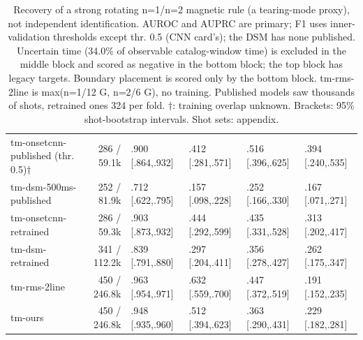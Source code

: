 \begin{table}[t]
\begin{tabular}{>{\raggedright\arraybackslash}p{1.75in}rllll}
tm-onsetcnn-published (thr. 0.5)$\dagger$ & 286 / 59.1k & .900 [.864,.932] & .412 [.281,.571] & .516 [.396,.625] & .394 [.240,.535] \\
tm-dsm-500ms-published & 252 / 81.9k & .712 [.622,.795] & .157 [.098,.228] & .252 [.166,.330] & .167 [.071,.271] \\
tm-onsetcnn-retrained & 286 / 59.3k & .903 [.873,.932] & .444 [.292,.599] & .435 [.331,.528] & .313 [.202,.417] \\
tm-dsm-retrained & 341 / 112.2k & .839 [.791,.880] & .297 [.204,.411] & .356 [.278,.427] & .262 [.175,.347] \\
tm-rms-2line & 450 / 246.8k & .963 [.954,.971] & .632 [.559,.700] & .447 [.372,.519] & .191 [.152,.235] \\
tm-ours & 450 / 246.8k & .948 [.935,.960] & .512 [.394,.623] & .363 [.290,.431] & .229 [.182,.281] \\
\bottomrule
\end{tabular}
\caption{Recovery of a strong rotating n=1/n=2 magnetic rule (a tearing-mode proxy), not independent identification. AUROC and AUPRC are primary; F1 uses inner-validation thresholds except thr. 0.5 (CNN card's); the DSM has none published. Uncertain time (34.0\% of observable catalog-window time) is excluded in the middle block and scored as negative in the bottom block; the top block has legacy targets. Boundary placement is scored only by the bottom block. tm-rms-2line is max(n=1/12 G, n=2/6 G), no training. Published models saw thousands of shots, retrained ones 324 per fold. $\dagger$: training overlap unknown. Brackets: 95\% shot-bootstrap intervals. Shot sets: appendix.}
\label{tab:tm-benchmark}
\end{table}
